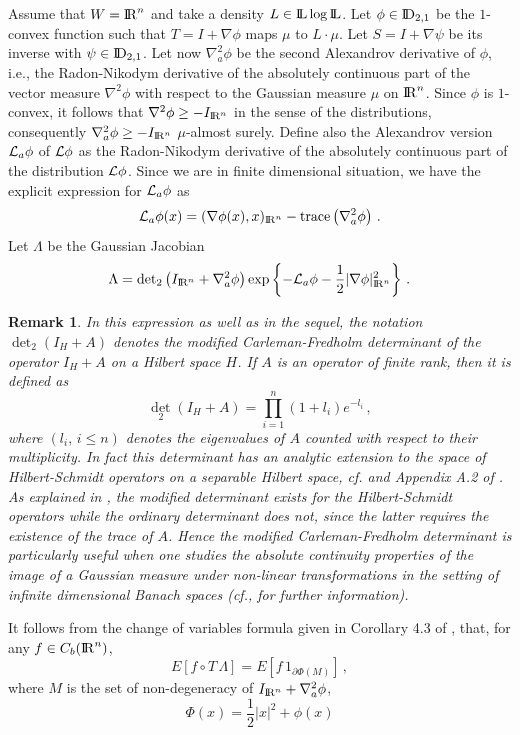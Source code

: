 \documentclass[12pt,a4paper]{book}
\newtheorem{remarkk}[theorem]{Remark}
\newcommand{\La}{\Lambda}
\newcommand{\reals}{{\rm I\!R}}
\newcommand{\DD}{{\rm I\!D}}
\newcommand{\LL}{{\rm I\!L}}
\newcommand{\calL}{{\cal L}}
\newcommand{\R}{{\rm I\!R}}
\newcommand{\dett}{{\textstyle{\det_2}}}
\begin{document}
Assume   that $W=\R^n$ and take a   density $L\in
\LL\log\LL$. Let $\phi\in \DD_{2,1}$ be the $1$-convex function such
that $T=I+\nabla \phi$ maps $\mu$ to $L\cdot \mu$. Let $S=I+\nabla\psi$
be its inverse with $\psi\in \DD_{2,1}$. 
Let now $\nabla_a^2\phi$ be the
second Alexandrov derivative of 
$\phi$, i.e.,  the Radon-Nikodym derivative of the absolutely
continuous part of the 
vector measure $\nabla^2\phi$ with respect to the Gaussian measure
$\mu$ on $\reals^n$. Since $\phi$ is $1$-convex, it follows that
$\nabla^2\phi\geq -I_{\reals^n}$ in the sense of the distributions,
consequently $\nabla_a^2\phi\geq -I_{\reals^n}$ $\mu$-almost
surely. Define also the Alexandrov version $\calL_a\phi$ of
$\calL\phi$ as the Radon-Nikodym derivative of  the absolutely
continuous part of the distribution 
$\calL\phi$. Since we are in finite dimensional situation, we have the
explicit expression for $\calL_a\phi$ as 
$$
\calL_a\phi(x)=(\nabla\phi(x),x)_{\reals^n}-{\rm
  trace}\left(\nabla_a^2\phi\right)\,.
$$
Let  $\La$ be the Gaussian  Jacobian 
$$
\La=\dett\left(I_{\R^n}+\nabla^2_a\phi\right)\exp\left\{-\calL_a\phi-
\frac{1}{2}|\nabla\phi|_{\R^n}^2\right\}\,.
$$
\begin{remarkk}{\rm
In this expression as well as in the sequel,  the notation
$\dett(I_H+A)$ denotes the modified 
Carleman-Fredholm determinant of the operator $I_H+A$ on a Hilbert
space $H$. If $A$ is an operator of finite rank, then it  is defined  as 
$$
\dett\left(I_H+A\right)=\prod_{i=1}^n(1+l_i)e^{-l_i}\,,
$$
where $(l_i,\,i\leq n)$ denotes the eigenvalues of $A$ counted with
respect to their multiplicity. In fact this determinant has an
analytic extension to the space of Hilbert-Schmidt operators on a
separable Hilbert space, cf.  \cite{D-S} and Appendix A.2 of
\cite{UZ7}. As explained in \cite{UZ7}, the modified determinant
exists for the Hilbert-Schmidt operators while the ordinary
determinant does not, since the latter  requires the existence of the trace of
$A$. Hence the modified Carleman-Fredholm determinant  is particularly
useful when one studies the absolute 
continuity properties of the image of a Gaussian measure under
non-linear transformations in the setting of infinite dimensional
Banach spaces (cf., \cite{UZ7} for further information).  }
\end{remarkk}
It follows from the change of variables formula given in  Corollary
4.3  of \cite{Mc2}, that, for any $f\in C_b(\R^n)$,  
$$
E[f\circ T \,\La]=E\left[f\,1_{\partial\Phi(M)}\right]\,,
$$
where $M$ is the set of non-degeneracy of $I_{\R^n}+\nabla_a^2\phi$,
$$
\Phi(x)=\frac{1}{2}|x|^2+\phi(x)
$$ 
\end{document}
